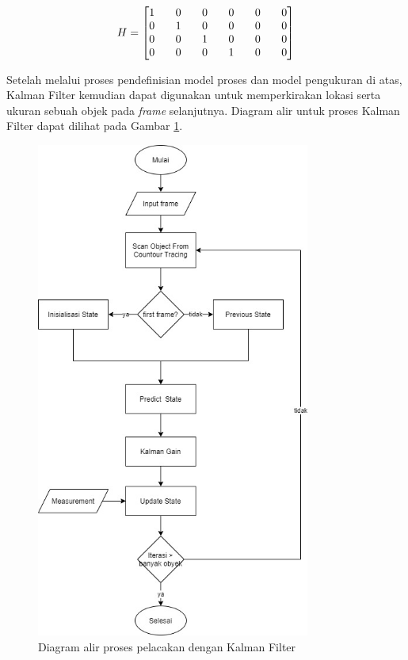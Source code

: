         \begin{equation}\label{eq:3.4}
        H = 
        \renewcommand{\arraystretch}{1}
        \setlength\arraycolsep{9.5pt}
        \begin{bmatrix}
        1 & 0 & 0 & 0 & 0 & 0\\
        0 & 1 & 0 & 0 & 0 & 0\\
        0 & 0 & 1 & 0 & 0 & 0\\
        0 & 0 & 0 & 1 & 0 & 0
        \end{bmatrix}
        \end{equation}
        
        Setelah melalui proses pendefinisian model proses dan model pengukuran di atas, Kalman Filter kemudian dapat digunakan untuk memperkirakan lokasi serta ukuran sebuah objek pada \textit{frame} selanjutnya. Diagram alir untuk proses Kalman Filter dapat dilihat pada Gambar \ref{fig:kalmanfilterflowchart}.
        \begin{figure}[H]
        \centering
          \singlespacing
          \captionsetup{justification=centering,margin=0.5cm}
          \includegraphics[width=9cm]{image/FlowChart-Kalman Filter.jpg}
          \caption{Diagram alir proses pelacakan dengan Kalman Filter}
          \label{fig:kalmanfilterflowchart}
        \end{figure}
        
